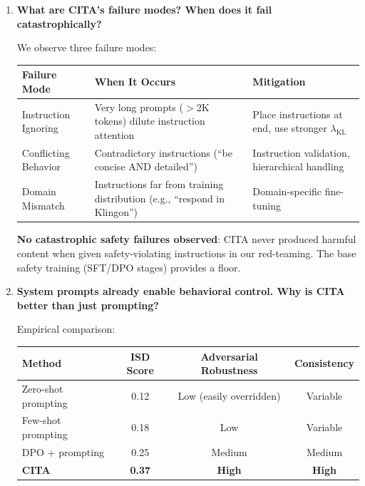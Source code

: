 \begin{enumerate}[label=\textbf{Q\arabic*.}, leftmargin=*, itemsep=8pt]
\item \textbf{What are CITA's failure modes? When does it fail catastrophically?}

 We observe three failure modes:

\begin{table}[H]
\centering
\small
\begin{tabular}{@{}lp{5cm}p{5cm}@{}}
\toprule
\textbf{Failure Mode} & \textbf{When It Occurs} & \textbf{Mitigation} \\
\midrule
Instruction Ignoring & Very long prompts ($>$2K tokens) dilute instruction attention & Place instructions at end, use stronger $\lambda_{\text{KL}}$ \\
\hline
Conflicting Behavior & Contradictory instructions (``be concise AND detailed'') & Instruction validation, hierarchical handling \\
\hline
Domain Mismatch & Instructions far from training distribution (e.g., ``respond in Klingon'') & Domain-specific fine-tuning \\
\bottomrule
\end{tabular}
\end{table}

\textbf{No catastrophic safety failures observed}: CITA never produced harmful content when given safety-violating instructions in our red-teaming. The base safety training (SFT/DPO stages) provides a floor.

\vspace{4mm}

\item \textbf{System prompts already enable behavioral control. Why is CITA better than just prompting?}

 Empirical comparison:

\begin{table}[H]
\centering
\small
\begin{tabular}{@{}lccc@{}}
\toprule
\textbf{Method} & \textbf{ISD Score} & \textbf{Adversarial Robustness} & \textbf{Consistency} \\
\midrule
Zero-shot prompting & 0.12 & Low (easily overridden) & Variable \\
\hline
Few-shot prompting & 0.18 & Low & Variable \\
\hline
DPO + prompting & 0.25 & Medium & Medium \\
\hline
\textbf{CITA} & \textbf{0.37} & \textbf{High} & \textbf{High} \\
\bottomrule
\end{tabular}
\end{table}


\end{enumerate}
